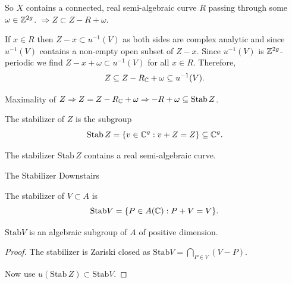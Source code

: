 \documentclass{beamer}
\begin{document}
\begin{frame}
  So $X$ contains a connected, real semi-algebraic curve $R$ passing
  through some $\omega\in{\mathbb{Z}}^{2g}$.  $\Rightarrow Z\subset Z-R+\omega$.

  If $x\in R$ then $Z-x\subset u^{-1}(V)$ as
  both sides are complex analytic and since $u^{-1}(V)$ contains a
  non-empty open subset of $Z-x$. Since $u^{-1}(V)$ is
  ${\mathbb{Z}}^{2g}$-periodic
  we find $Z-x+\omega\subset u^{-1}(V)$ for all $x\in
  R$. Therefore,
  \begin{equation*}
    Z\subseteq Z-R_{\mathbb{C}}+\omega \subseteq u^{-1}(V).
  \end{equation*}

  Maximality of $Z \Rightarrow Z = Z-R_{{\mathbb{C}}}+\omega \Rightarrow
  -R+\omega \subseteq \mathrm{Stab}\, Z$.

  \begin{definition}
    The \alert{stabilizer}
       of $Z$ is the subgroup
    \begin{equation*}
      \mathrm{Stab}\, Z = \{v\in {\mathbb{C}}^g : v+Z=Z\} \subseteq{\mathbb{C}}^g.
    \end{equation*}
  \end{definition}

  \begin{lemma}
    The stabilizer $\mathrm{Stab}\, Z$ contains a real semi-algebraic curve. 
  \end{lemma}
\end{frame}

\begin{frame}{The Stabilizer Downstairs}
  \begin{definition}
    The \alert{stabilizer} of $V\subset A$ is
    \begin{equation*}
      \mathrm{Stab} V = \{P\in A({\mathbb{C}}) : P+V=V\}. 
    \end{equation*}
  \end{definition}


  \begin{lemma}
     $\mathrm{Stab} V$ is an algebraic subgroup of $A$ of
    positive dimension.
  \end{lemma}
  \begin{proof}
    The stabilizer is Zariski closed as
      $\mathrm{Stab} V = \bigcap_{P \in V} (V-P)$.
    
    Now use $u(\mathrm{Stab}\,Z) \subset\mathrm{Stab} V$.  
  \end{proof}  
\end{frame}
\end{document}
